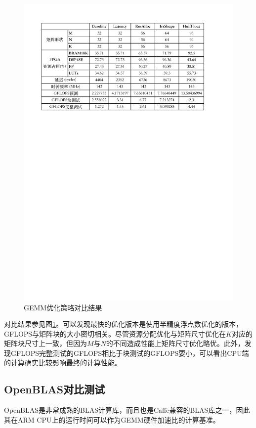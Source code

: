 \begin{figure}[!ht]
	\centering	
	\includegraphics[width=\textwidth]{assets/imgs/gemmcomp.pdf}
	\caption{GEMM优化策略对比结果}
	\label{fig:gemmopt}
\end{figure}

对比结果参见图\ref{fig:gemmopt}。可以发现最快的优化版本是使用半精度浮点数优化的版本，GFLOPS与矩阵块的大小密切相关。尽管资源分配优化与矩阵尺寸优化在$K$对应的矩阵块尺寸上一致，但因为$M$与$N$的不同造成性能上矩阵尺寸优化略优。此外，发现GFLOPS完整测试的GFLOPS相比于块测试的GFLOPS要小，可以看出CPU端的计算确实比较影响最终的计算性能。

\subsection{OpenBLAS对比测试}

OpenBLAS是非常成熟的BLAS计算库，而且也是Caffe兼容的BLAS库之一，因此其在ARM CPU上的运行时间可以作为GEMM硬件加速比的计算基准。

